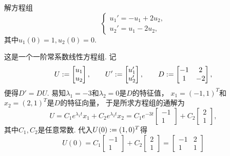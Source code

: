\begin{example}
解方程组\begin{equation*}
	\begin{cases}
		u_1' = -u_1 + 2u_2, \\
		u_2' = u_1 - 2u_2,
	\end{cases}
\end{equation*}
其中\(
	u_1(0) = 1,
	u_2(0) = 0
\).
\begin{solution}
这是一个一阶常系数线性方程组.
记\begin{equation*}
	U := \begin{bmatrix}
		u_1 \\ u_2
	\end{bmatrix},
	\qquad
	U' := \begin{bmatrix}
		u_1' \\ u_2'
	\end{bmatrix},
	\qquad
	D := \begin{bmatrix}
		-1 & 2 \\
		1 & -2
	\end{bmatrix},
\end{equation*}
便得\(D' = D U\).
易知\(\lambda_1=-3\)和\(\lambda_2=0\)是\(D\)的特征值，
\(x_1=(-1,1)^T\)和\(x_2=(2,1)^T\)是\(D\)的特征向量，
于是所求方程组的通解为\begin{equation*}
	U = C_1 e^{\lambda_1 t} x_1 + C_2 e^{\lambda_2 t} x_2
	= C_1 e^{-3t} \begin{bmatrix}
		-1 \\ 1
	\end{bmatrix}
	+ C_2 \begin{bmatrix}
		2 \\ 1
	\end{bmatrix},
\end{equation*}
其中\(C_1,C_2\)是任意常数.
代入\(U(0) := (1,0)^T\)得\begin{equation*}
	U(0)
	= C_1 \begin{bmatrix}
		-1 \\ 1
	\end{bmatrix}
	+ C_2 \begin{bmatrix}
		2 \\ 1
	\end{bmatrix}
	= \begin{bmatrix}
		-1 & 2 \\
		1 & 1
	\end{bmatrix}

\end{equation*}
\end{solution}
\end{example}
